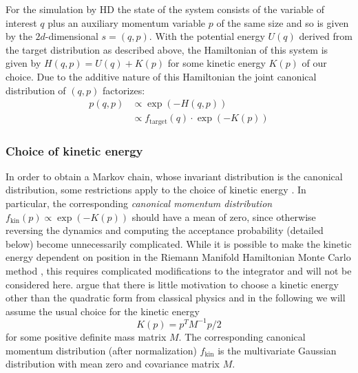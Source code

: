 For the simulation by HD the state of the system consists of the variable of interest $q$ plus an auxiliary momentum variable $p$ of the same size and so is given by the $2d$-dimensional $s = (q, p)$. With the potential energy $U(q)$ derived from the target distribution as described above, the Hamiltonian of this system is given by $H(q, p) = U(q) + K(p)$ for some kinetic energy $K(p)$ of our choice. Due to the additive nature of this Hamiltonian the joint canonical distribution of $(q, p)$ factorizes:
\begin{equation} \label{eq:JointDensity}
\begin{split}
p(q, p) &\propto \exp \left( -H(q, p) \right) \\
			&\propto f_\textrm{target}(q) \cdot \exp{(-K(p))}
\end{split}
\end{equation}

\subsubsection{Choice of kinetic energy}
In order to obtain a Markov chain, whose invariant distribution is the canonical distribution, some restrictions apply to the choice of kinetic energy \parencite{Betancourt2014}. In particular, the corresponding \textit{canonical momentum distribution} $f_\textrm{kin}(p) \propto \exp{(-K(p))}$ should have a mean of zero, since otherwise reversing the dynamics and computing the acceptance probability (detailed below) become unnecessarily complicated. While it is possible to make the kinetic energy dependent on position in the Riemann Manifold Hamiltonian Monte Carlo method \parencite{Girolami2011}, this requires complicated modifications to the integrator and will not be considered here. \textcite{Betancourt2014} argue that there is little motivation to choose a kinetic energy other than the quadratic form from classical physics and in the following we will assume the usual choice for the kinetic energy
\begin{equation} \label{eq:KineticEnergy}
K(p) = p^T M^{-1} p/2
\end{equation}
for some positive definite mass matrix $M$. The corresponding canonical momentum distribution (after normalization) $f_\textrm{kin}$ is the multivariate Gaussian distribution with mean zero and covariance matrix $M$.

